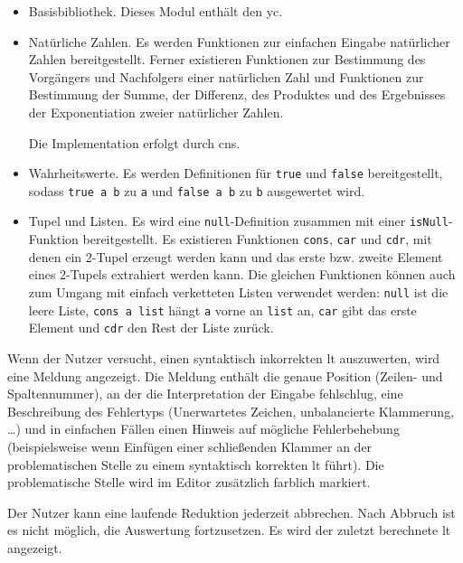 \documentclass[parskip=full,11pt,twoside]{scrartcl}
\begin{document}
\begin{itemize}
	\item Basisbibliothek. Dieses Modul enthält den \gls{yc}.

	\item Natürliche Zahlen. Es werden Funktionen zur einfachen Eingabe natürlicher
		Zahlen bereitgestellt. Ferner existieren Funktionen zur Bestimmung des Vorgängers
		und Nachfolgers einer natürlichen Zahl und Funktionen zur Bestimmung der Summe,
		der Differenz, des Produktes und des Ergebnisses der Exponentiation zweier
		natürlicher Zahlen.

		Die Implementation erfolgt durch \glspl{cn}.

	\item Wahrheitswerte. Es werden Definitionen für \texttt{true} und \texttt{false}
		bereitgestellt, sodass \texttt{true a b} zu \texttt{a} und \texttt{false a b}
		zu \texttt{b} ausgewertet wird.

	\item Tupel und Listen. Es wird eine \texttt{null}-Definition zusammen mit einer
		\texttt{isNull}-Funktion bereitgestellt. Es existieren Funktionen
		\texttt{cons}, \texttt{car} und \texttt{cdr}, %
		mit denen ein 2-Tupel erzeugt werden kann und das erste bzw. zweite Element
		eines 2-Tupels extrahiert werden kann. Die gleichen Funktionen können auch zum
		Umgang mit einfach verketteten Listen verwendet werden: \texttt{null} ist die
		leere Liste, \texttt{cons a list} hängt \texttt{a} vorne an \texttt{list} an,
		\texttt{car} gibt das erste Element und \texttt{cdr} den Rest der Liste zurück.

\end{itemize}

Wenn der Nutzer versucht, einen syntaktisch inkorrekten \gls{lt} auszuwerten,
wird eine Meldung angezeigt. Die Meldung enthält die genaue Position (Zeilen-
und Spaltennummer), an der die Interpretation der Eingabe fehlschlug, eine Beschreibung
des Fehlertyps (Unerwartetes Zeichen, unbalancierte Klammerung, \ldots) und in einfachen
Fällen einen Hinweis auf mögliche Fehlerbehebung (beispielsweise wenn Einfügen einer
schließenden Klammer an der problematischen Stelle zu einem syntaktisch korrekten
\gls{lt} führt).
Die problematische Stelle wird im Editor zusätzlich farblich markiert.

Der Nutzer kann eine laufende Reduktion jederzeit abbrechen.
Nach Abbruch ist es nicht möglich, die Auswertung fortzusetzen.
Es wird der zuletzt berechnete \gls{lt} angezeigt.
\end{document}
